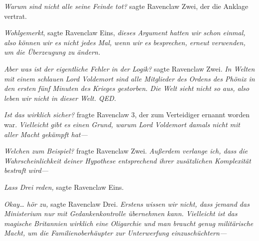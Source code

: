 \emph{Warum sind nicht alle seine Feinde tot?} sagte Ravenclaw Zwei, der die Anklage vertrat.

\emph{Wohlgemerkt}, sagte Ravenclaw Eins, \emph{dieses Argument hatten wir schon einmal, also können wir es nicht jedes Mal, wenn wir es besprechen, erneut verwenden, um die Überzeugung zu ändern.}

\emph{Aber was ist der eigentliche Fehler in der Logik?} sagte Ravenclaw Zwei. \emph{In Welten mit einem schlauen Lord Voldemort sind alle Mitglieder des Ordens des Phönix in den ersten fünf Minuten des Krieges gestorben. Die Welt sieht nicht so aus, also leben wir nicht in dieser Welt. QED.}

\emph{Ist das wirklich sicher?} fragte Ravenclaw 3, der zum Verteidiger ernannt worden war. \emph{Vielleicht gibt es einen Grund, warum Lord Voldemort damals nicht mit aller Macht gekämpft hat—}

\emph{Welchen zum Beispiel?} fragte Ravenclaw Zwei. \emph{Außerdem verlange ich, dass die Wahrscheinlichkeit deiner Hypothese entsprechend ihrer zusätzlichen Komplexität bestraft wird—}

\emph{Lass Drei reden,} sagte Ravenclaw Eins.

\emph{Okay… hör zu,} sagte Ravenclaw Drei. \emph{Erstens wissen wir nicht, dass jemand das Ministerium nur mit Gedankenkontrolle übernehmen kann. Vielleicht ist das magische Britannien wirklich eine Oligarchie und man braucht genug militärische Macht, um die Familienoberhäupter zur Unterwerfung einzuschüchtern—}

